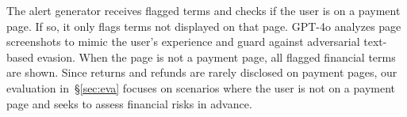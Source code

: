 


The alert generator receives flagged \termname terms and checks if the user is on a payment page. If so, it only flags terms not displayed on that page. GPT-4o analyzes page screenshots to mimic the user's experience and guard against adversarial text-based evasion. When the page is not a payment page, all flagged financial terms are shown. Since returns and refunds are rarely disclosed on payment pages, our evaluation in~\S\ref{sec:eva} focuses on scenarios where the user is not on a payment page and seeks to assess financial risks in advance.




